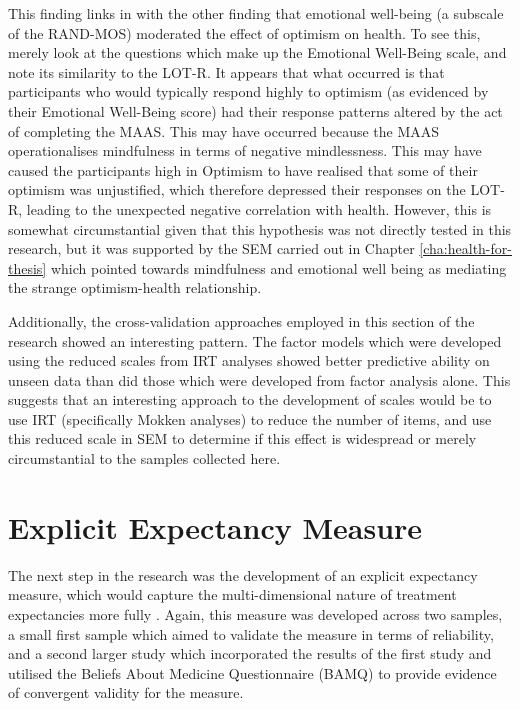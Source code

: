 This finding links in with the other finding that emotional well-being (a subscale of the RAND-MOS) moderated the effect of optimism on health. To see this, merely look at the questions which make up the Emotional Well-Being scale, and note its similarity to the LOT-R. It appears that what occurred is that participants who would typically respond highly to optimism (as evidenced by their Emotional Well-Being score) had their response patterns altered by the act of completing the MAAS. This may have occurred because the MAAS operationalises mindfulness in terms of negative mindlessness. This may have caused the participants high in Optimism to have realised that some of their optimism was unjustified, which therefore depressed their responses on the LOT-R, leading to the unexpected negative correlation with health. However, this is somewhat circumstantial given that this hypothesis was not directly tested in this research, but it was supported by the SEM carried out in Chapter \ref{cha:health-for-thesis} which pointed towards mindfulness and emotional well being as mediating the strange optimism-health relationship.

Additionally, the cross-validation approaches employed in this section of the research showed an interesting pattern. The factor models which were developed using the reduced scales from IRT analyses showed better predictive ability on unseen data than did those which were developed from factor analysis alone. This suggests that an interesting approach to the development of scales would be to use IRT (specifically Mokken analyses) to reduce the number of items, and use this reduced scale in SEM to determine if this effect is widespread or merely circumstantial to the samples collected here. 

\section{Explicit Expectancy Measure}
\label{sec:expl-expect-meas}

The next step in the research was the development of an explicit expectancy measure, which would capture the multi-dimensional nature of treatment expectancies more fully \cite{Stone2005}. Again, this measure was developed across two samples, a small first sample which aimed to validate the measure in terms of reliability, and a second larger study which incorporated the results of the first study and utilised the Beliefs About Medicine Questionnaire (BAMQ) \cite{Horne1999} to provide evidence of convergent validity for the measure. 

